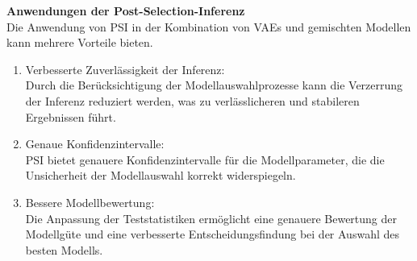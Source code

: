 \documentclass[%
thesis=student,%
coverpage=false,%
titlepage=false,%
headmarks=true, %
german,%
font=libertine, %
math=newpxtx, %
BCOR=5mm,%
coverBCOR=11mm%
]{tumbook}
\theoremstyle{break}
\begin{document}
\textbf{Anwendungen der Post-Selection-Inferenz}\\
Die Anwendung von PSI in der Kombination von VAEs und gemischten Modellen kann mehrere Vorteile bieten.
\\
\begin{enumerate}
	\item{Verbesserte Zuverlässigkeit der Inferenz:}\\
	Durch die Berücksichtigung der Modellauswahlprozesse kann die Verzerrung der Inferenz reduziert werden, was zu verlässlicheren und stabileren Ergebnissen führt.\\
	\item{Genaue Konfidenzintervalle:}\\
	PSI bietet genauere Konfidenzintervalle für die Modellparameter, die die Unsicherheit der Modellauswahl korrekt widerspiegeln.\\
	\item{Bessere Modellbewertung:}\\ 
	Die Anpassung der Teststatistiken ermöglicht eine genauere Bewertung der Modellgüte und eine verbesserte Entscheidungsfindung bei der Auswahl des besten Modells.
\end{enumerate}
\end{document}
